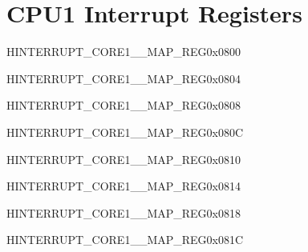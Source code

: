 
\chapter{CPU1 Interrupt Registers}

\begin{register}{H}{INTERRUPT\_CORE1\_\_MAP\_REG}{0x0800}\label{regdesc:INTERRUPTCORE1MACINTRMAPREG}
\end{register}
\vspace{-3em}

\begin{register}{H}{INTERRUPT\_CORE1\_\_MAP\_REG}{0x0804}\label{regdesc:INTERRUPTCORE1MACNMIMAPREG}
\end{register}
\vspace{-3em}

\begin{register}{H}{INTERRUPT\_CORE1\_\_MAP\_REG}{0x0808}\label{regdesc:INTERRUPTCORE1PWRINTRMAPREG}
\end{register}
\vspace{-3em}

\begin{register}{H}{INTERRUPT\_CORE1\_\_MAP\_REG}{0x080C}\label{regdesc:INTERRUPTCORE1BBINTMAPREG}
\end{register}
\vspace{-3em}

\begin{register}{H}{INTERRUPT\_CORE1\_\_MAP\_REG}{0x0810}\label{regdesc:INTERRUPTCORE1BTMACINTMAPREG}
\end{register}
\vspace{-3em}

\begin{register}{H}{INTERRUPT\_CORE1\_\_MAP\_REG}{0x0814}\label{regdesc:INTERRUPTCORE1BTBBINTMAPREG}
\end{register}
\vspace{-3em}

\begin{register}{H}{INTERRUPT\_CORE1\_\_MAP\_REG}{0x0818}\label{regdesc:INTERRUPTCORE1BTBBNMIMAPREG}
\end{register}
\vspace{-3em}

\begin{register}{H}{INTERRUPT\_CORE1\_\_MAP\_REG}{0x081C}\label{regdesc:INTERRUPTCORE1RWBTIRQMAPREG}
\end{register}
\vspace{-3em}


